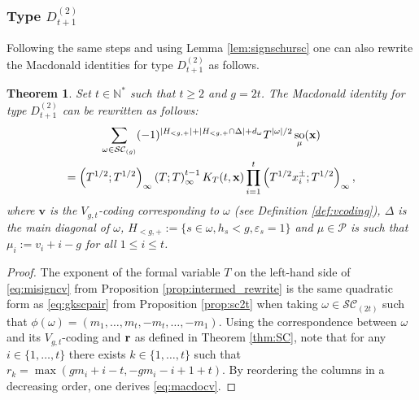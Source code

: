 \documentclass[11pt,letterpaper]{amsart}
\def\bbbz{\mathbb Z}
\def\ccsc{\mathcal {SC}}
\def\ccp{\mathcal P}
\def\det{{\rm det}}
\newtheorem{thm}[df]{Theorem}
\DeclareMathOperator{\oo}{so}
\numberwithin{equation}{section}
\numberwithin{df}{section}
\begin{document}
\subsubsection{Type $D^{(2)}_{t+1}$}

Following the same steps and using Lemma \ref{lem:signschursc} one can also rewrite the Macdonald identities for type $D^{(2)}_{t+1}$ as follows.
\begin{thm}\label{prop:MacdotypeCv}
Set $t\in\mathbb{N}^*$ such that $t\geq 2$ and $g=2t$. The Macdonald identity for type $D^{(2)}_{t+1}$ can be rewritten as follows:
\begin{multline}\label{eq:macdocv}
\sum_{\omega\in\ccsc_{(g)}} (-1)^{\lvert H_{<g,+}\rvert+\lvert H_{<g,+}\cap \Delta\rvert+d_\omega}T^{\lvert\omega\rvert/2}\oo_{\mu}({\bf x})\\
=\left(T^{1/2};T^{1/2}\right)_\infty\left(T;T\right)_\infty^{t-1}
K_T(t,{\bf x})\prod_{i=1}^t \left(T^{1/2}x_i^{\pm};T^{1/2}\right)_\infty,
\end{multline}
where $\mathbf{v}$ is the $V_{g,t}$-coding corresponding to $\omega$ (see Definition \ref{def:vcoding}), $\Delta$ is the main diagonal of $\omega$, $H_{<g,+}:=\lbrace s\in\omega, h_s<g, \varepsilon_s=1\rbrace$ and $\mu\in\ccp$ is such that
$\mu_i:=v_i+i-g$ for all $1\leq i \leq t$.
\end{thm}
\begin{proof}

The exponent of the formal variable $T$ on the left-hand side of \eqref{eq:misigncv} from Proposition \ref{prop:intermed_rewrite} is the same quadratic form as  \eqref{eq:gkscpair} from Proposition \ref{prop:sc2t} when taking $\omega\in\ccsc_{(2t)}$ such that $\phi(\omega)=(m_1,\dots,m_t,-m_t,\dots,-m_1)$. Using the correspondence between $\omega$ and its $V_{g,t}$-coding and $\bf{r}$ as defined in Theorem \ref{thm:SC}, note that for any $i\in\lbrace 1,\dots,t\rbrace$ there exists $k\in\lbrace 1,\dots,t\rbrace$ such that $r_k=\max(gm_i+i-t,-gm_i-i+1+t)$.
By reordering the columns in a decreasing order, one derives \eqref{eq:macdocv}.
\end{proof}
\end{document}
